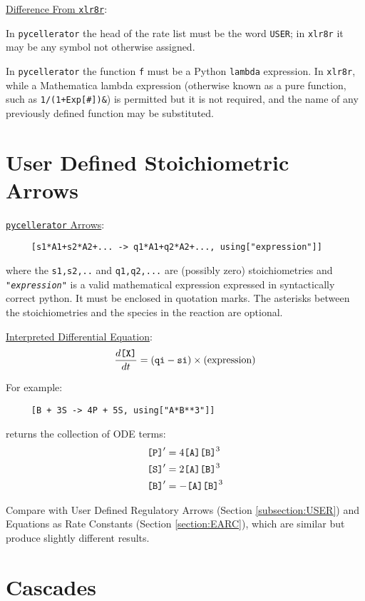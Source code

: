 {\underline{Difference From {\tt xlr8r}}:

In {\tt pycellerator} the head of the rate list must be the word {\tt USER}; in {\tt xlr8r} it may be any symbol not otherwise assigned.

In {\tt pycellerator} the function {\tt f} must be a Python {\tt lambda} expression. In {\tt xlr8r}, while a Mathematica lambda expression (otherwise known as a pure function, such as \verb.1/(1+Exp[#])&.) is permitted but it is not required, and the name of any previously defined function may be substituted. 

\clearpage

\section{User Defined Stoichiometric Arrows}
\label{section:USERST}

\underline{{\tt pycellerator} Arrows}:
\begin{lstlisting}
     [s1*A1+s2*A2+... -> q1*A1+q2*A2+..., using["expression"]]
\end{lstlisting}
where the {\tt s1,s2,..} and {\tt q1,q2,...} are (possibly zero) stoichiometries and {\tt "\textit{expression}"} is a valid mathematical expression expressed in syntactically correct python. It must be enclosed in quotation marks. The asterisks between the stoichiometries and the species in the reaction are optional. 

\underline{Interpreted Differential Equation}:
\begin{equation}
\frac{d\text{\tt{[X]}}}{dt} = (\text{\tt{qi}}-\text{\tt{si}}) \times \text{(expression)}
\end{equation}


For example:
\begin{lstlisting}
     [B + 3S -> 4P + 5S, using["A*B**3"]]
\end{lstlisting}
returns the collection of ODE terms:
\begin{align*}
\text{\tt{[P]}}' &= 4\text{\tt{[A][B]}}^3\\
\text{\tt{[S]}}' &= 2\text{\tt{[A][B]}}^3\\
\text{\tt{[B]}}' &= -\text{\tt{[A][B]}}^3
\end{align*}

Compare with User Defined Regulatory Arrows (Section \ref{subsection:USER}) and Equations as Rate Constants (Section \ref{section:EARC}), which are similar but produce slightly different results. 

\newpage

\section{Cascades}

}

